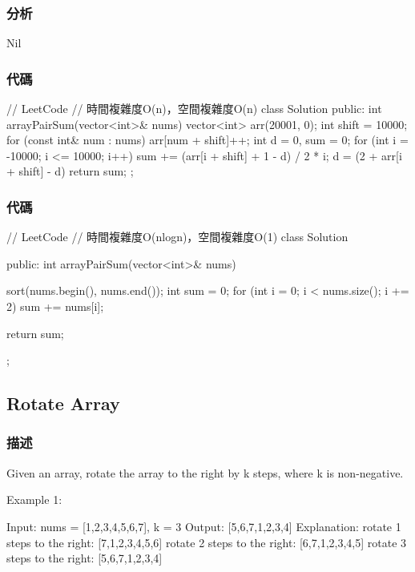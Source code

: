 \subsubsection{分析}
Nil

\subsubsection{代碼}
\begin{Code}
// LeetCode
// 時間複雜度O(n)，空間複雜度O(n)
class Solution {
public:
    int arrayPairSum(vector<int>& nums) {
        vector<int> arr(20001, 0);
        int shift = 10000;
        for (const int& num : nums)
            arr[num + shift]++;
        int d = 0, sum = 0;
        for (int i = -10000; i <= 10000; i++)
        {
            sum += (arr[i + shift] + 1 - d) / 2 * i;
            d = (2 + arr[i + shift] - d) %
        }
        return sum;
    }
};
\end{Code}

\subsubsection{代碼}
\begin{Code}
// LeetCode
// 時間複雜度O(nlogn)，空間複雜度O(1)
class Solution {
public:
    int arrayPairSum(vector<int>& nums) {
        sort(nums.begin(), nums.end());
        int sum = 0;
        for (int i = 0; i < nums.size(); i += 2)
            sum += nums[i];

        return sum;
    }
};
\end{Code}


\subsection{Rotate Array}
\label{sec:rotate-array}

\subsubsection{描述}
Given an array, rotate the array to the right by k steps, where k is non-negative.

Example 1:
\begin{Code}
Input: nums = [1,2,3,4,5,6,7], k = 3
Output: [5,6,7,1,2,3,4]
Explanation:
rotate 1 steps to the right: [7,1,2,3,4,5,6]
rotate 2 steps to the right: [6,7,1,2,3,4,5]
rotate 3 steps to the right: [5,6,7,1,2,3,4]
\end{Code}

